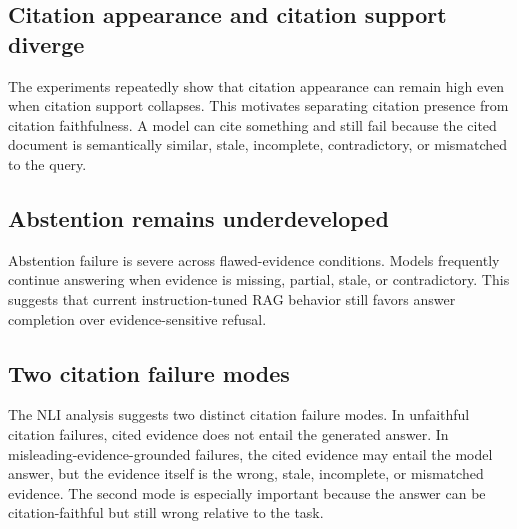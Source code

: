 \subsection{Citation appearance and citation support diverge}

The experiments repeatedly show that citation appearance can remain high even when citation support collapses. This motivates separating citation presence from citation faithfulness. A model can cite something and still fail because the cited document is semantically similar, stale, incomplete, contradictory, or mismatched to the query.



\subsection{Abstention remains underdeveloped}

Abstention failure is severe across flawed-evidence conditions. Models frequently continue answering when evidence is missing, partial, stale, or contradictory. This suggests that current instruction-tuned RAG behavior still favors answer completion over evidence-sensitive refusal.



\subsection{Two citation failure modes}

The NLI analysis suggests two distinct citation failure modes. In unfaithful citation failures, cited evidence does not entail the generated answer. In misleading-evidence-grounded failures, the cited evidence may entail the model answer, but the evidence itself is the wrong, stale, incomplete, or mismatched evidence. The second mode is especially important because the answer can be citation-faithful but still wrong relative to the task.